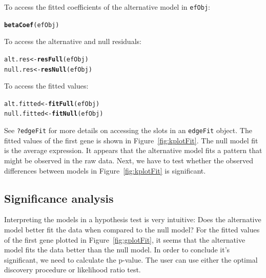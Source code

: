 \documentclass{article}\usepackage[]{graphicx}\usepackage[]{color}
\makeatletter
\newcommand{\hlstd}[1]{\textcolor[rgb]{0.345,0.345,0.345}{#1}}%
\newcommand{\hlkwb}[1]{\textcolor[rgb]{0.69,0.353,0.396}{#1}}%
\newcommand{\hlkwd}[1]{\textcolor[rgb]{0.737,0.353,0.396}{\textbf{#1}}}%
\newenvironment{kframe}{%
 \def\at@end@of@kframe{}%
 \ifinner\ifhmode%
  \def\at@end@of@kframe{\end{minipage}}%
  \begin{minipage}{\columnwidth}%
 \fi\fi%
 \def\FrameCommand##1{\hskip\@totalleftmargin \hskip-\fboxsep
 \colorbox{shadecolor}{##1}\hskip-\fboxsep
     \hskip-\linewidth \hskip-\@totalleftmargin \hskip\columnwidth}%
 \MakeFramed {\advance\hsize-\width
   \@totalleftmargin\z@ \linewidth\hsize
   \@setminipage}}%
 {\par\unskip\endMakeFramed%
 \at@end@of@kframe}
\newenvironment{knitrout}{}{} %
\makeatother
\begin{document}
To access the fitted coefficients of the alternative model in {\tt efObj}:
\begin{knitrout}
\color{fgcolor}\begin{kframe}
\begin{alltt}
\hlkwd{betaCoef}\hlstd{(efObj)}
\end{alltt}
\end{kframe}
\end{knitrout}
To access the alternative and null residuals:
\begin{knitrout}
\color{fgcolor}\begin{kframe}
\begin{alltt}
\hlstd{alt.res} \hlkwb{<-} \hlkwd{resFull}\hlstd{(efObj)}
\hlstd{null.res} \hlkwb{<-} \hlkwd{resNull}\hlstd{(efObj)}
\end{alltt}
\end{kframe}
\end{knitrout}
To access the fitted values:
\begin{knitrout}
\color{fgcolor}\begin{kframe}
\begin{alltt}
\hlstd{alt.fitted} \hlkwb{<-} \hlkwd{fitFull}\hlstd{(efObj)}
\hlstd{null.fitted} \hlkwb{<-} \hlkwd{fitNull}\hlstd{(efObj)}
\end{alltt}
\end{kframe}
\end{knitrout}

See {\tt ?edgeFit} for more details on accessing the slots in an {\tt edgeFit} object. The fitted values of the first gene is shown in Figure~\ref{fig:kplotFit}. The null model fit is the average expression. It appears that the alternative model fits a pattern that might be observed in the raw data. Next, we have to test whether the observed differences between models in Figure~\ref{fig:kplotFit} is significant.

\subsection{Significance analysis}
Interpreting the models in a hypothesis test is very intuitive: Does the alternative model better fit the data when compared to the null model? For the fitted values of the first gene plotted in Figure~\ref{fig:gplotFit}, it seems that the alternative model fits the data better than the null model. In order to conclude it's significant, we need to calculate the p-value. The user can use either the optimal discovery procedure or likelihood ratio test. 
\end{document}
